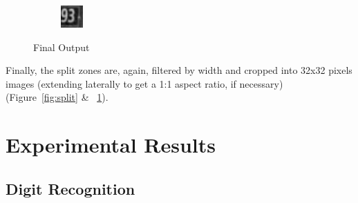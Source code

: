 \documentclass{article} %
\begin{document}
\begin{figure}
\begin{subfigure}{.3\textwidth}
\end{subfigure}
\begin{subfigure}{.3\textwidth}
  \centering
  \includegraphics[width=.8\linewidth]{images/image01}
\end{subfigure}
\caption{Final Output}
\label{fig:output}
\end{figure}

Finally, the split zones are, again, filtered by width and cropped into 32x32 pixels images (extending laterally to get a 1:1 aspect ratio, if necessary) (Figure~\ref{fig:split} \& ~\ref{fig:output}).


\section{Experimental Results}
\subsection{Digit Recognition}
\end{document}
